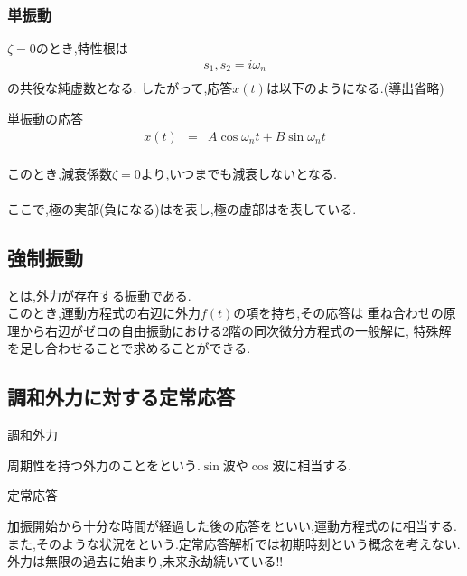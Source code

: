 \documentclass[a4paper]{jsarticle}
\begin{document}
\subsubsection{単振動}
$\zeta = 0$のとき,特性根は
\begin{eqnarray*}
    s_1,s_2=i\omega_n\\
\end{eqnarray*}
の共役な純虚数となる.
したがって,応答$x\left(t\right)$は以下のようになる.(導出省略)
\begin{itembox}[l]{単振動の応答}
    \begin{eqnarray*}
        x\left(t\right)&=&A\cos{\omega_nt}+B\sin{\omega_nt}\\
    \end{eqnarray*}
\end{itembox}
このとき,減衰係数$\zeta=0$より,いつまでも減衰しないとなる.\\
\\
ここで,極の実部(負になる)はを表し,極の虚部はを表している.
\subsection{強制振動}
とは,外力が存在する振動である.\\
このとき,運動方程式の右辺に外力$f\left(t\right)$の項を持ち,その応答は
重ね合わせの原理から右辺がゼロの自由振動における2階の同次微分方程式の一般解に,
特殊解を足し合わせることで求めることができる.\\
\subsection{調和外力に対する定常応答}
\begin{itembox}[l]{調和外力}
    \begin{center}
        周期性を持つ外力のことをという.$\sin$波や$\cos$波に相当する.
    \end{center}
\end{itembox}
\begin{itembox}[l]{定常応答}
    \begin{center}
        加振開始から十分な時間が経過した後の応答をといい,運動方程式のに相当する.\\
        また,そのような状況をという.定常応答解析では初期時刻という概念を考えない.\\
        外力は無限の過去に始まり,未来永劫続いている!!
    \end{center}
\end{itembox}
\end{document}
